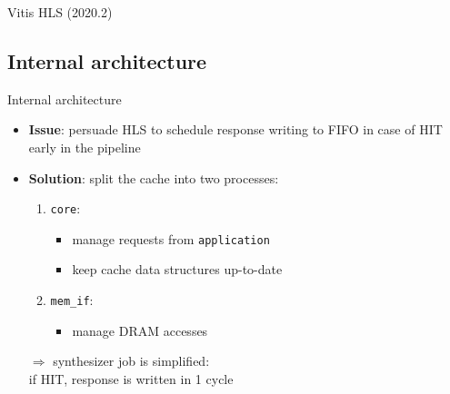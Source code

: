 \documentclass{beamer}
\begin{document}
\begin{frame}{Vitis HLS (2020.2)}
\begin{minipage}{.1\textwidth}
\begin{center}
		\end{center}
	\end{minipage}
\end{frame}

\subsection{Internal architecture}
\begin{frame}{Internal architecture}
	\begin{minipage}{.7\textwidth}
	\begin{itemize}
		\item \textbf{Issue}: persuade HLS to schedule response writing
			to FIFO in case of HIT early in the pipeline
		\item \textbf{Solution}: split the cache into two processes:
			\begin{enumerate}
				\item \texttt{core}:
					\begin{itemize}
						\item manage requests from \texttt{application}
						\item keep cache data structures up-to-date
					\end{itemize}
				\item \texttt{mem\_if}:
					\begin{itemize}
						\item manage DRAM accesses
					\end{itemize}
			\end{enumerate}
			$\Rightarrow$ synthesizer job is simplified:\\
			if HIT, response is written in 1 cycle
	\end{itemize}
	\end{minipage}
	\begin{minipage}{.29\textwidth}
		\begin{center}

\end{center}
\end{minipage}
\end{frame}
\end{document}
